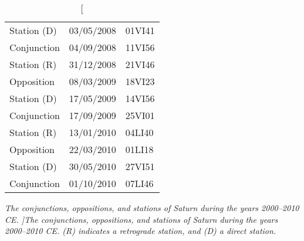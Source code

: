 \begin{table}
{\begin{tabular}{lcl}
Station (D) & 03/05/2008 & 01VI41\\
Conjunction & 04/09/2008 & 11VI56\\
Station (R) & 31/12/2008 & 21VI46\\
Opposition & 08/03/2009 & 18VI23\\
Station (D) & 17/05/2009 & 14VI56\\
Conjunction & 17/09/2009 & 25VI01\\
Station (R) & 13/01/2010 & 04LI40\\
Opposition & 22/03/2010 & 01LI18\\
Station (D) & 30/05/2010 & 27VI51\\
Conjunction & 01/10/2010 & 07LI46\\
\end{tabular}}
\caption[\em  The conjunctions, oppositions, and stations of Saturn
during the years 2000--2010 CE. ]{\em The conjunctions, oppositions, and stations of Saturn
during the years 2000--2010 CE. (R) indicates a retrograde station, and (D)
a direct station.}\label{vtsaturn}
\end{table}
